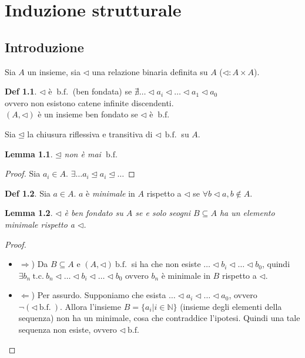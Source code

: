 \documentclass[a4paper]{report}
\newcommand{\bnfn}{\ \mathrm{b.f.}\ }
\newcommand{\sse}{se e solo se}
\newcommand{\tc}{\ \mathrm{t.c.}\ }
\theoremstyle{definition} \newtheorem*{defi}{Def}
\theoremstyle{plain} \newtheorem{lemma}{Lemma}
\theoremstyle{plain} \newtheorem{teo}{Teorema}
\theoremstyle{remark} \newtheorem*{es}{Esempio}
\begin{document}
\chapter{Induzione strutturale}
\section*{Introduzione}
Sia $A$ un insieme, sia $\lhd$ una relazione binaria definita su $A$
($\lhd : A \times A$).
\begin{defi}
  $\lhd$ è $\bnfn$ (ben fondata) se $\nexists \ldots \lhd a_i \lhd \ldots \lhd a_1 \lhd a_0$
  \\
  ovvero non esistono catene infinite discendenti.
  \\
  $(A, \lhd)$ è un insieme ben fondato se $\lhd$ è $\bnfn$
\end{defi}
Sia $\unlhd$ la chiusura riflessiva e transitiva di $\lhd \ \bnfn$ su $A$.
\begin{lemma}
  $\unlhd$ non è mai $\bnfn$
\end{lemma}
\begin{proof}
  Sia $a_i \in A$. $\exists \ldots a_i \unlhd a_i \unlhd \ldots$ \qedhere
\end{proof}
\begin{defi}
  Sia $a \in A$. $a$ è \emph{minimale} in $A$ rispetto a $\lhd$ se
  $\forall b \lhd a, b \not\in A$.
\end{defi}
\begin{lemma}
  \label{lemma:2}
  $\lhd$ è ben fondato su $A$ \sse ogni $B \subseteq A$ ha un elemento
  minimale rispetto a $\lhd$.
\end{lemma}
\begin{proof}
  \begin{itemize}
    \item{$\Rightarrow$)} Da $ B \subseteq A$ e $(A, \lhd) \bnfn$ si ha che
      non esiste $\ldots \lhd b_i \lhd \ldots \lhd b_0$, quindi 
      $\exists b_n \tc b_n \lhd \ldots \lhd b_i \lhd \ldots \lhd b_0$
      ovvero $b_n$ è minimale in $B$ rispetto a $\lhd$.
    \item{$\Leftarrow$)} Per assurdo. Supponiamo che esista
      $\ldots \lhd a_i \lhd \ldots \lhd a_0$, ovvero $\neg (\lhd \bnfn)$.
      Allora l'insieme $B=\{a_i|i\in\mathbb{N}\}$ (insieme degli elementi
      della sequenza) non ha un minimale, cosa che contraddice l'ipotesi.
      Quindi una tale sequenza non esiste, ovvero $\lhd \bnfn$
  \end{itemize}
\end{proof}
\end{document}
